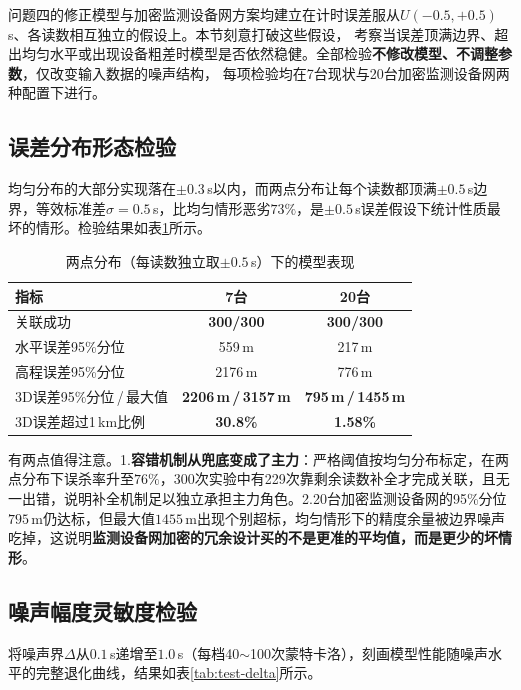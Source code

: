 \documentclass[draft,12pt,a4paper]{ctexart}
\theoremstyle{definition}
\begin{document}
问题四的修正模型与加密监测设备网方案均建立在计时误差服从$U(-0.5,+0.5)$\,s、各读数相互独立的假设上。本节刻意打破这些假设，
考察当误差顶满边界、超出均匀水平或出现设备粗差时模型是否依然稳健。全部检验\textbf{不修改模型、不调整参数}，仅改变输入数据的噪声结构，
每项检验均在7台现状与20台加密监测设备网两种配置下进行。

\subsection{误差分布形态检验}

均匀分布的大部分实现落在$\pm0.3$\,s以内，而两点分布让每个读数都顶满$\pm0.5$\,s边界，等效标准差$\sigma=0.5$\,s，比均匀情形恶劣$73\%$，是$\pm0.5$\,s误差假设下统计性质最坏的情形。检验结果如表\ref{tab:test-bimodal}所示。

\begin{table}[H]\centering
  \caption{两点分布（每读数独立取$\pm0.5$\,s）下的模型表现}\label{tab:test-bimodal}
  \small
  \begin{tabular}{lcc}
    \toprule
    \textbf{指标} & \textbf{7台} & \textbf{20台} \\
    \midrule
    关联成功 & \textbf{300/300} & \textbf{300/300} \\
    水平误差95\%分位 & 559\,m & 217\,m \\
    高程误差95\%分位 & 2176\,m & 776\,m \\
    3D误差95\%分位\,/\,最大值 & \textbf{2206\,m\,/\,3157\,m} & \textbf{795\,m\,/\,1455\,m} \\
    3D误差超过1\,km比例 & \textbf{30.8\%} & \textbf{1.58\%} \\
    \bottomrule
  \end{tabular}
\end{table}

有两点值得注意。1.\textbf{容错机制从兜底变成了主力}：严格阈值按均匀分布标定，在两点分布下误杀率升至$76\%$，300次实验中有229次靠剩余读数补全才完成关联，且无一出错，说明补全机制足以独立承担主力角色。2.20台加密监测设备网的95\%分位$795$\,m仍达标，但最大值$1455$\,m出现个别超标，均匀情形下的精度余量被边界噪声吃掉，这说明\textbf{监测设备网加密的冗余设计买的不是更准的平均值，而是更少的坏情形}。

\subsection{噪声幅度灵敏度检验}

将噪声界$\Delta$从$0.1$\,s递增至$1.0$\,s（每档40$\sim$100次蒙特卡洛），刻画模型性能随噪声水平的完整退化曲线，结果如表\ref{tab:test-delta}所示。
\end{document}
